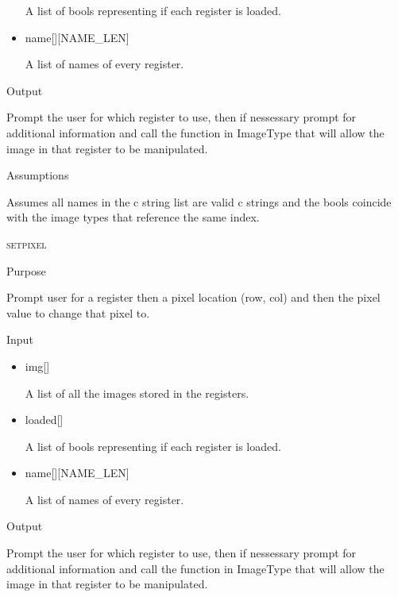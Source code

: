 \documentclass[pdftex, 11pt]{article}
\begin{document}
\begin{description}
\begin{description}
\begin{itemize}
						A list of bools representing if each register is loaded.

					\item{name[][NAME\_LEN]}

						A list of names of every register.

				\end{itemize}

			\item{Output}

				Prompt the user for which register to use, then if nessessary
				prompt for additional information and call the function
				in ImageType that will allow the image in that register to
				be manipulated.

			\item{Assumptions}

				Assumes all names in the c string list are valid c
				strings and the bools coincide with the image types that
				reference the same index.

		\end{description}



	\item{\textsc{setpixel}}
		\begin{description}
			\item{Purpose}

				Prompt user for a register then a pixel location (row, col) and then the pixel
				value to change that pixel to.

			\item{Input}

				\begin{itemize}

					\item{img[]}

						A list of all the images stored in the registers.

					\item{loaded[]}

						A list of bools representing if each register is loaded.

					\item{name[][NAME\_LEN]}

						A list of names of every register.

				\end{itemize}

			\item{Output}

				Prompt the user for which register to use, then if nessessary
				prompt for additional information and call the function
				in ImageType that will allow the image in that register to
				be manipulated.


\end{description}
\end{description}
\end{document}
